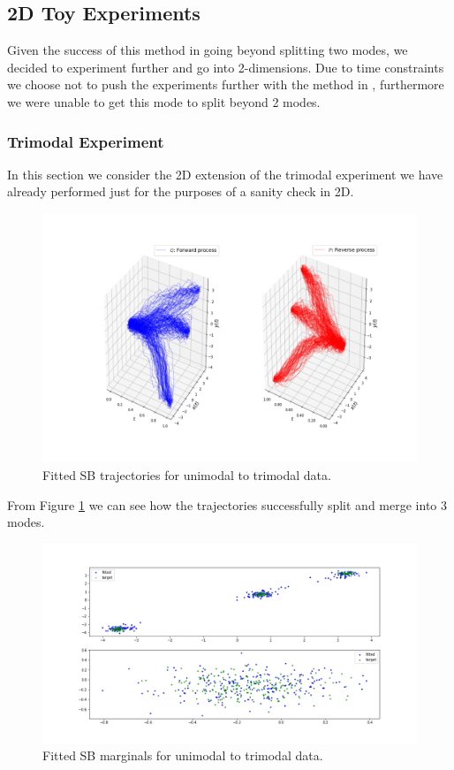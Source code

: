 \documentclass[a4paper,12pt,twoside,openright]{report}
\theoremstyle{definition}
\begin{document}
\subsection{2D Toy Experiments}

Given the success of this method in going beyond splitting two modes, we decided to experiment further and go into 2-dimensions. Due to time constraints we choose not to push the experiments further with the method in \cite{pavon2018data}, furthermore we were unable to get this mode to split beyond 2 modes. 

\subsubsection{Trimodal Experiment}
In this section we consider the 2D extension of the trimodal experiment we have already performed just for the purposes of a sanity check in 2D. 
\begin{figure}
    \centering
    \includegraphics[scale=0.45,trim={5.3cm 1cm 2.5cm 0}, clip]{images/GP/2d_3mode_GP_means_3.3_3.6_0.7_std_0.1_200.png}
    \caption{ Fitted SB trajectories for unimodal to trimodal data.  }
    \label{fig:3mode2d200trajectroies2d}
\end{figure}
From Figure \ref{fig:3mode2d200trajectroies2d}  we can see how the trajectories successfully split and merge into 3 modes.
\begin{figure}
    \centering
    \includegraphics[scale=0.4,trim={4.3cm 1cm 2.5cm 0}, clip]{images/GP/2d_3mode_GP_means_3.3_3.6_0.7_std_0.1_scatter_200_.png}
    \caption{ Fitted SB marginals for unimodal to trimodal data.  }
    \label{fig:3mode2d200}
\end{figure}
\end{document}
